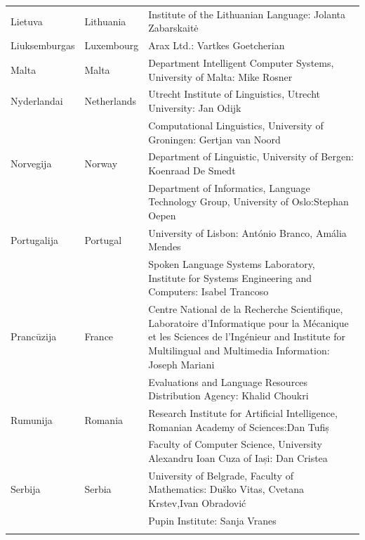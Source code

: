 \begin{longtable}{llp{105mm}}
  Lietuva & \textcolor{grey1}{Lithuania} & Institute of the Lithuanian Language: Jolanta Zabarskaitė\\ \addlinespace
  
  Liuksemburgas & \textcolor{grey1}{Luxembourg} & Arax Ltd.: Vartkes Goetcherian\\ \addlinespace
  
  Malta & \textcolor{grey1}{Malta} & Department Intelligent Computer Systems, University of Malta: Mike Rosner\\ \addlinespace
  
  Nyderlandai & \textcolor{grey1}{Netherlands} & Utrecht Institute of Linguistics, Utrecht University: Jan Odijk\\ \addlinespace 
  & & Computational Linguistics, University of Groningen: Gertjan van Noord\\ \addlinespace
  
  Norvegija & \textcolor{grey1}{Norway} & Department of Linguistic, University of Bergen: Koenraad De Smedt\\ \addlinespace 
  & & Department of Informatics, Language Technology Group, University of Oslo:\newline Stephan Oepen \\ \addlinespace
  
  Portugalija & \textcolor{grey1}{Portugal} & University of Lisbon: António Branco, Amália Mendes \\ \addlinespace
  & & Spoken Language Systems Laboratory, Institute for Systems Engineering and Computers: Isabel Trancoso \\ \addlinespace
  
  Prancūzija & \textcolor{grey1}{France} & Centre National de la Recherche Scientifique, Laboratoire d'Informatique pour la Mécanique et les Sciences de l'Ingénieur and Institute for Multilingual and Multimedia Information: Joseph Mariani \\ \addlinespace
  & & Evaluations and Language Resources Distribution Agency: Khalid Choukri\\ \addlinespace
   
  Rumunija & \textcolor{grey1}{Romania} & Research Institute for Artificial Intelligence, Romanian Academy of Sciences:\newline Dan Tufiș \\ \addlinespace
  & & Faculty of Computer Science, University Alexandru Ioan Cuza of Iași: Dan Cristea \\ \addlinespace
  
  Serbija & \textcolor{grey1}{Serbia} & University of Belgrade, Faculty of Mathematics: Duško Vitas, Cvetana Krstev,\newline Ivan Obradović \\ \addlinespace
  & & Pupin Institute: Sanja Vranes \\ \addlinespace
    

\end{longtable}
